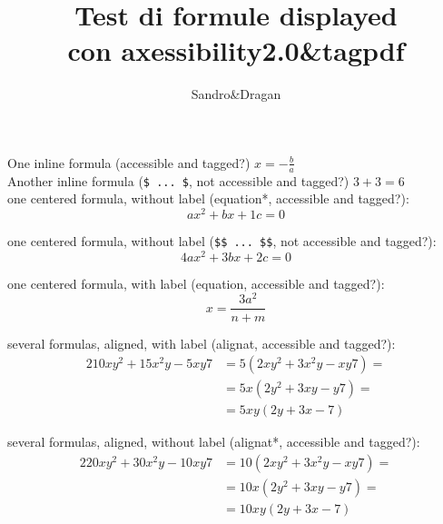 \documentclass{article}
\title{Test di formule displayed\\con axessibility2.0\&tagpdf}
\author{Sandro\&Dragan}
\date{}
\begin{document}
\pagestyle{empty}



\maketitle

One inline formula (accessible and tagged?)
  \tagmcend
\tagstructend
 \( x= - \frac{b}{a} \) \\

Another inline formula (\verb|$ ... $|, not accessible and tagged?)
  \tagmcend
\tagstructend
$3 + 3 = 6$ \\ 

one centered formula, without label (equation*, accessible and tagged?):
  \tagmcend
\tagstructend
\begin{equation*}
a x^2 + b x + 1 c = 0
\end{equation*}

one centered formula, without label (\verb|$$ ... $$|, not accessible and tagged?):
  \tagmcend
\tagstructend
$$
4a x^2 +3 b x + 2 c = 0
$$

one centered formula, with label (equation, accessible and tagged?):
  \tagmcend
\tagstructend
\begin{equation}
x=\frac{3a^2}{n+m}
\end{equation}

several formulas, aligned, with label (alignat, accessible and tagged?):
  \tagmcend
\tagstructend
\begin{alignat}{2}
10xy^2+15x^2y-5xy7 & =  5\left(2xy^2+3x^2y-xy7\right) = \\
   & = 5x\left(2y^2+3xy-y7\right) = \\
   & = 5xy\left(2y+3x-7\right)
\end{alignat}

several formulas, aligned, without label (alignat*, accessible and tagged?):
  \tagmcend
\tagstructend
\begin{alignat*}{2}
20xy^2+30x^2y-10xy7 & =  10\left(2xy^2+3x^2y-xy7\right) = \\
   & = 10x\left(2y^2+3xy-y7\right) = \\
   & = 10xy\left(2y+3x-7\right)
\end{alignat*}
\end{document}

